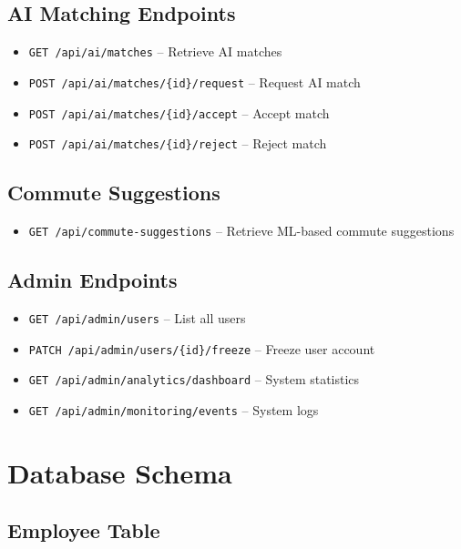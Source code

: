 \subsection{AI Matching Endpoints}

\begin{itemize}
    \item \texttt{GET /api/ai/matches} -- Retrieve AI matches
    \item \texttt{POST /api/ai/matches/\{id\}/request} -- Request AI match
    \item \texttt{POST /api/ai/matches/\{id\}/accept} -- Accept match
    \item \texttt{POST /api/ai/matches/\{id\}/reject} -- Reject match
\end{itemize}

\subsection{Commute Suggestions}

\begin{itemize}
    \item \texttt{GET /api/commute-suggestions} -- Retrieve ML-based commute suggestions
\end{itemize}

\subsection{Admin Endpoints}

\begin{itemize}
    \item \texttt{GET /api/admin/users} -- List all users
    \item \texttt{PATCH /api/admin/users/\{id\}/freeze} -- Freeze user account
    \item \texttt{GET /api/admin/analytics/dashboard} -- System statistics
    \item \texttt{GET /api/admin/monitoring/events} -- System logs
\end{itemize}

\section{Database Schema}

\subsection{Employee Table}

